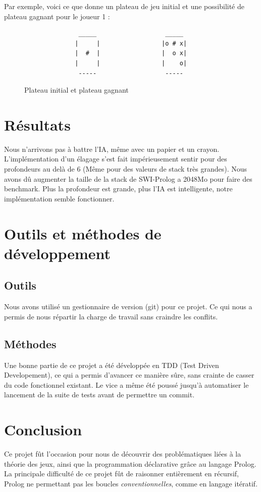 \documentclass[a4paper,12pt]{article}
\begin{document}
  Par exemple, voici ce que donne un plateau de jeu initial et une possibilité de plateau gagnant pour le joueur 1 :
  \begin{figure}[H]
  \begin{verbatim}
               _____                   _____
              |     |                 |o # x|
              |  #  |                 |  o x|
              |     |                 |    o|
               -----                   -----
  \end{verbatim}
  \caption{Plateau initial et plateau gagnant}
  \end{figure}
  
\section{Résultats}
Nous n'arrivons pas à battre l'IA, même avec un papier et un crayon. L'implémentation d'un élagage s'est fait impérieusement sentir pour des profondeurs au delà de 6 (Même pour des valeurs de stack très grandes). Nous avons dû augmenter la taille de la stack de SWI-Prolog a 2048Mo pour faire des benchmark. Plus la profondeur est grande, plus l'IA est intelligente, notre implémentation semble fonctionner.

\section{Outils et méthodes de développement}
\subsection{Outils}
Nous avons utilisé un gestionnaire de version (git) pour ce projet. Ce qui nous a permis de nous répartir la charge de travail sans craindre les conflits. 
\subsection{Méthodes}
Une bonne partie de ce projet a été développée en TDD (Test Driven Developement), ce qui a permis d'avancer ce manière sûre, sans crainte de casser du code fonctionnel existant. Le vice a même été poussé jusqu'à automatiser le lancement de la suite de tests avant de permettre un commit.

\section{Conclusion}
Ce projet fût l'occasion pour nous de découvrir des problématiques liées à la théorie des jeux, ainsi que la programmation déclarative grâce au langage Prolog. La principale difficulté de ce projet fût de raisonner entièrement en récursif, Prolog ne permettant pas les boucles \emph{conventionnelles}, comme en langage itératif.
\end{document}
